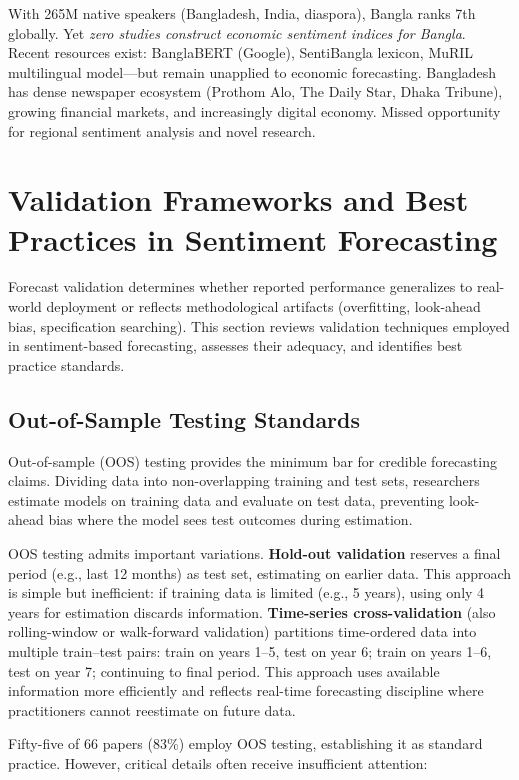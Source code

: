 \documentclass[11pt]{article}
\begin{document}
With 265M native speakers (Bangladesh, India, diaspora), Bangla ranks 7th globally. Yet \textit{zero studies construct economic sentiment indices for Bangla}. Recent resources exist: BanglaBERT (Google), SentiBangla lexicon, MuRIL multilingual model—but remain unapplied to economic forecasting. Bangladesh has dense newspaper ecosystem (Prothom Alo, The Daily Star, Dhaka Tribune), growing financial markets, and increasingly digital economy. Missed opportunity for regional sentiment analysis and novel research.

\section{Validation Frameworks and Best Practices in Sentiment Forecasting}

Forecast validation determines whether reported performance generalizes to real-world deployment or reflects methodological artifacts (overfitting, look-ahead bias, specification searching). This section reviews validation techniques employed in sentiment-based forecasting, assesses their adequacy, and identifies best practice standards.

\subsection{Out-of-Sample Testing Standards}

Out-of-sample (OOS) testing provides the minimum bar for credible forecasting claims. Dividing data into non-overlapping training and test sets, researchers estimate models on training data and evaluate on test data, preventing look-ahead bias where the model sees test outcomes during estimation.

OOS testing admits important variations. \textbf{Hold-out validation} reserves a final period (e.g., last 12 months) as test set, estimating on earlier data. This approach is simple but inefficient: if training data is limited (e.g., 5 years), using only 4 years for estimation discards information. \textbf{Time-series cross-validation} (also rolling-window or walk-forward validation) partitions time-ordered data into multiple train--test pairs: train on years 1--5, test on year 6; train on years 1--6, test on year 7; continuing to final period. This approach uses available information more efficiently and reflects real-time forecasting discipline where practitioners cannot reestimate on future data.

Fifty-five of 66 papers (83\%) employ OOS testing, establishing it as standard practice. However, critical details often receive insufficient attention:
\end{document}
